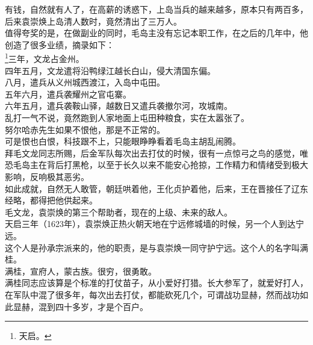 \begin{multicols}{\theparacolNo}
有钱，自然就有人了，在高薪的诱惑下，上岛当兵的越来越多，原本只有两百多，后来袁崇焕上岛清人数时，竟然清出了三万人。\\

值得夸奖的是，在做副业的同时，毛岛主没有忘记本职工作，在之后的几年中，他创造了很多业绩，摘录如下：\\

\footnote{天启。}三年，文龙占金州。\\

四年五月，文龙遣将沿鸭绿江越长白山，侵大清国东偏。\\

八月，遣兵从义州城西渡江，入岛中屯田。\\

五年六月，遣兵袭耀州之官屯寨。\\

六年五月，遣兵袭鞍山驿，越数日又遣兵袭撤尔河，攻城南。\\

乱打一气不说，竟然跑到人家地面上屯田种粮食，实在太嚣张了。\\

努尔哈赤先生如果不恨他，那是不正常的。\\

可是恨也白恨，科技跟不上，只能眼睁睁看着毛岛主胡乱闹腾。\\

拜毛文龙同志所赐，后金军队每次出去打仗的时候，很有一点惊弓之鸟的感觉，唯恐毛岛主在背后打黑枪，以至于长久以来不能安心抢掠，工作精力和情绪受到极大影响，反响极其恶劣。\\

如此成就，自然无人敢管，朝廷哄着他，王化贞护着他，后来，王在晋接任了辽东经略，都得把他供起来。\\

毛文龙，袁崇焕的第三个帮助者，现在的上级、未来的敌人。\\

天启三年（1623年），袁崇焕正热火朝天地在宁远修城墙的时候，另一个人到达宁远。\\

这个人是孙承宗派来的，他的职责，是与袁崇焕一同守护宁远。这个人的名字叫满桂。\\

满桂，宣府人，蒙古族。很穷，很勇敢。\\

满桂同志应该算是个标准的打仗苗子，从小爱好打猎。长大参军了，就爱好打人，在军队中混了很多年，每次出去打仗，都能砍死几个，可谓战功显赫，然而战功如此显赫，混到四十多岁，才是个百户。\\


\end{multicols}
